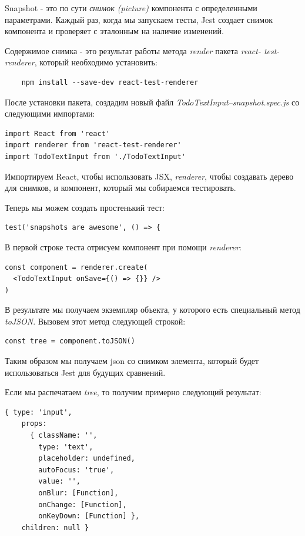 Snapshot - это по сути \textit{снимок (picture)} компонента с определенными параметрами. Каждый раз, когда мы запускаем тесты, Jest создает снимок компонента и проверяет с эталонным на наличие изменений.

Содержимое снимка - это результат работы метода \textit{render} пакета \textit{react- test-renderer}, который необходимо установить:

\begin{lstlisting}
	npm install --save-dev react-test-renderer
\end{lstlisting}

После установки пакета, создадим новый файл \textit{TodoTextInput–snapshot.spec.js} со следующими импортами:

\begin{lstlisting}
import React from 'react'
import renderer from 'react-test-renderer'
import TodoTextInput from './TodoTextInput'
\end{lstlisting}

Импортируем React, чтобы использовать JSX, \textit{renderer}, чтобы создавать дерево для снимков, и компонент, который мы собираемся тестировать.

Теперь мы можем создать простенький тест:

\begin{lstlisting}
test('snapshots are awesome', () => {
\end{lstlisting}

В первой строке теста отрисуем компонент при помощи \textit{renderer}:

\begin{lstlisting}
const component = renderer.create(
  <TodoTextInput onSave={() => {}} />
)
\end{lstlisting}

В результате мы получаем экземпляр объекта, у которого есть специальный метод \textit{toJSON}. Вызовем этот метод следующей строкой:

\begin{lstlisting}
const tree = component.toJSON()
\end{lstlisting}

Таким образом мы получаем json со снимком элемента, который будет использоваться Jest для будущих сравнений.

Если мы распечатаем \textit{tree}, то получим примерно следующий результат:

\begin{lstlisting}
{ type: 'input',
    props:
      { className: '',
        type: 'text',
        placeholder: undefined,
        autoFocus: 'true',
        value: '',
        onBlur: [Function],
        onChange: [Function],
        onKeyDown: [Function] },
    children: null }
\end{lstlisting} 

